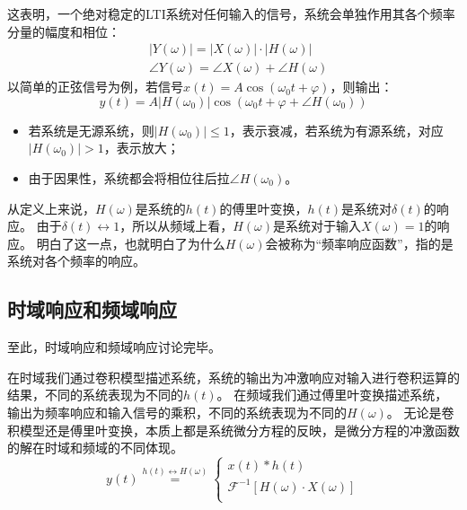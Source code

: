 这表明，一个绝对稳定的LTI系统对任何输入的信号，系统会单独作用其各个频率分量的幅度和相位：
\begin{align*}
&\left| Y\left( \omega \right) \right|=\left| X\left( \omega \right) \right|\cdot \left| H\left( \omega \right) \right| \\
&\angle Y\left( \omega \right) =\angle X\left( \omega \right) +\angle H\left( \omega \right)
\end{align*}
以简单的正弦信号为例，若信号$x\left( t \right) =A\cos \left( \omega _0t+\varphi \right) $，则输出：
\[
y\left( t \right) =A\left| H\left( \omega _0 \right) \right|\cos \left( \omega _0t+\varphi +\angle H\left( \omega _0 \right) \right)
\]
\begin{itemize}
    \item 若系统是无源系统，则$\left| H\left( \omega _0 \right) \right|\leqslant 1$，表示衰减，若系统为有源系统，对应$\left| H\left( \omega _0 \right) \right|>1$，表示放大；
    \item 由于因果性，系统都会将相位往后拉$\angle H\left( \omega _0 \right) $。
\end{itemize}

从定义上来说，$H\left( \omega \right) $是系统的$h\left( t \right) $的傅里叶变换，$h\left( t \right) $是系统对$\delta \left( t \right) $的响应。
由于$\delta \left( t \right) \leftrightarrow 1$，所以从频域上看，$H\left( \omega \right) $是系统对于输入$X\left( \omega \right) =1$的响应。
明白了这一点，也就明白了为什么$H\left( \omega \right) $会被称为“频率响应函数”，指的是系统对各个频率的响应。

\subsection{时域响应和频域响应}

至此，时域响应和频域响应讨论完毕。

在时域我们通过卷积模型描述系统，系统的输出为冲激响应对输入进行卷积运算的结果，不同的系统表现为不同的$h\left( t \right) $。
在频域我们通过傅里叶变换描述系统，输出为频率响应和输入信号的乘积，不同的系统表现为不同的$H\left( \omega \right) $。
无论是卷积模型还是傅里叶变换，本质上都是系统微分方程的反映，是微分方程的冲激函数的解在时域和频域的不同体现。
\[
y\left( t \right) \overset{h\left( t \right) \leftrightarrow H\left( \omega \right)}{=}\begin{cases}
	x\left( t \right) \ast h\left( t \right)\\
	\mathscr{F} ^{-1}\left[ H\left( \omega \right) \cdot X\left( \omega \right) \right]\\
\end{cases}
\]

